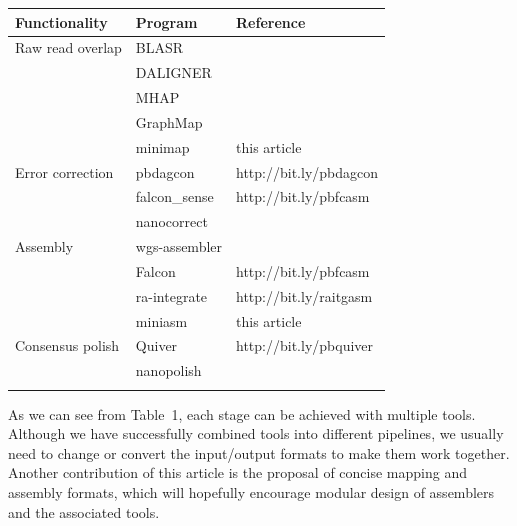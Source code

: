 \documentclass{bioinfo}
\begin{document}
\begin{table}[b]
{\footnotesize
\begin{tabular}{p{2.4cm}p{2cm}l}
\toprule
Functionality & Program & Reference \\
\midrule
Raw read overlap & BLASR & \citet{Chaisson:2012aa}\\
& DALIGNER & \citet{DBLP:conf/wabi/Myers14} \\
& MHAP & \citet{Berlin:2015xy} \\
& GraphMap & \citet{sovic:2015aa} \\
& minimap & this article \\
Error correction & pbdagcon & http://bit.ly/pbdagcon \\
& falcon\_sense & http://bit.ly/pbfcasm \\
& nanocorrect & \citet{Loman:2015xu} \\
Assembly & wgs-assembler & \citet{Myers:2000kl} \\
& Falcon & http://bit.ly/pbfcasm \\
& ra-integrate & http://bit.ly/raitgasm \\
& miniasm & this article \\
Consensus polish & Quiver & http://bit.ly/pbquiver \\
& nanopolish & \citet{Loman:2015xu} \\
\botrule
\end{tabular}
}{}
\end{table}

As we can see from Table~1, each stage can be achieved with multiple tools.
Although we have successfully combined tools into different pipelines, we
usually need to change or convert the input/output formats to make them work
together. Another contribution of this article is the proposal of concise
mapping and assembly formats, which will hopefully encourage modular design of
assemblers and the associated tools.
\end{document}
